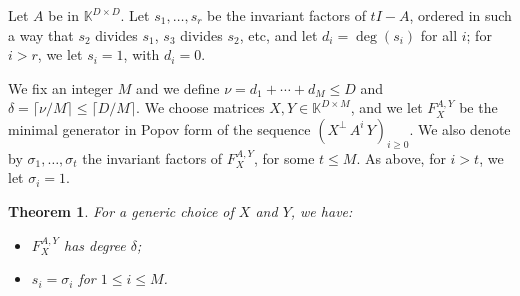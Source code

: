 \documentclass[12pt]{article}
\newtheorem{theorem}[definition]{Theorem}
\def\K{\mathbb{K}}
\def\Deg{D}
\begin{document}
	

Let $A$ be in $\K^{\Deg\times \Deg}$. Let $s_1,\dots,s_r$ be the
invariant factors of $t I - A$, ordered in such a way that $s_2$
divides $s_1$, $s_3$ divides $s_2$, etc, and let $d_i=\deg(s_i)$ for
all $i$; for $i > r$, we let $s_i=1$, with $d_i=0$. 

We fix an integer $M$ and we define $\nu=d_1 +\cdots +d_M \le \Deg$
and $\delta =\lceil \nu/M\rceil \le \lceil \Deg/M\rceil$.
We choose matrices $X,Y \in \mathbb{K}^{D\times M}$, and we let
$F_X^{A,Y}$ be the minimal generator in Popov form of the sequence
$(X^\perp\, A^i\, Y)_{i \ge 0}$. We also denote by $\sigma_1,\dots,\sigma_t$ the
invariant factors of $F_X^{A,Y}$, for some $t \le M$. As above, for $i
> t$, we let $\sigma_i =1$.

\begin{theorem}
  For a generic choice of $X$ and $Y$, we have:
  \begin{itemize}
  \item $F_X^{A,Y}$ has degree $\delta$;
  \item $s_i = \sigma_i$ for $1 \le i \le M$.
  \end{itemize}
\end{theorem}
\end{document}
